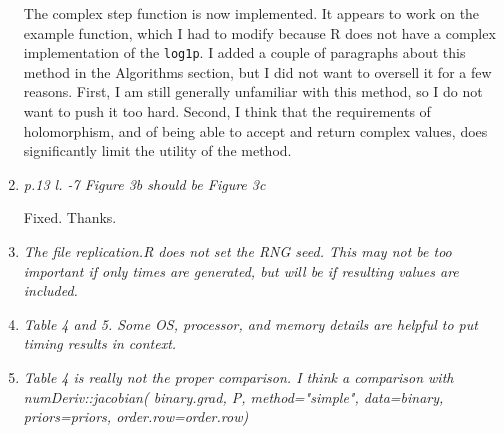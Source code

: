\documentclass{article}
\newcommand{\proglang}[1]{\textsf{#1}}
\newcommand{\code}[1]{\texttt{#1}}
\newcommand{\func}[1]{\code{#1}}
\newenvironment{revQuote}{\itshape}{\vspace{\baselineskip}}
\newenvironment{response}{\normalfont}{\vspace{\baselineskip}}
\begin{document}
\begin{enumerate}
\begin{revQuote}
  \end{revQuote}

\begin{response}
  The complex step function is now implemented.  It appears to work on
  the example function, which I had to modify because \proglang{R}
  does not have a complex implementation of the \func{log1p}.  I added
  a couple of paragraphs about this method in the Algorithms section,
  but I did not want to oversell it for a few reasons.  First, I am
  still generally unfamiliar with this method, so I do not want to
  push it too hard.  Second, I think that the requirements of
  holomorphism, and of being able to accept and return complex values,
  does significantly limit the utility of the method.
\end{response}


\item \begin{revQuote}
 p.13  l. -7  Figure 3b  should be Figure 3c
  \end{revQuote}

\begin{response}
  Fixed.  Thanks.
\end{response}


\item \begin{revQuote}
 The file replication.R does not set the RNG seed. This may not be too
important if only times are generated, but will be if resulting values are
included.
    
  \end{revQuote}

\begin{response}
  
\end{response}


\item \begin{revQuote}
Table 4 and 5. Some OS, processor, and memory details are helpful to put
timing results in context.
  \end{revQuote}

\begin{response}
  
\end{response}


\item\begin{revQuote}
Table 4 is really not the proper comparison. I think a comparison with
       numDeriv::jacobian( binary.grad, P, method="simple", 
                   data=binary, priors=priors,
order.row=order.row)


\end{revQuote}
\end{enumerate}
\end{document}
